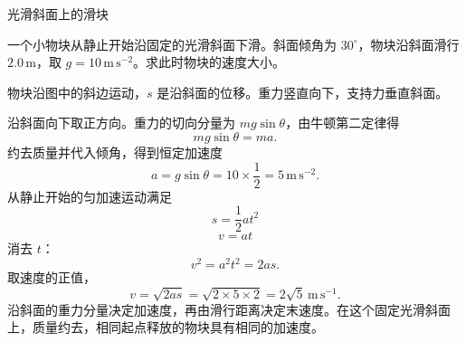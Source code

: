 \documentclass[11pt,a4paper]{article}
\begin{document}
\begin{center}\Large 光滑斜面上的滑块\end{center}
一个小物块从静止开始沿固定的光滑斜面下滑。斜面倾角为 $30^\circ$，物块沿斜面滑行 $2.0\,\mathrm m$，取 $g=10\,\mathrm{m\,s^{-2}}$。求此时物块的速度大小。
\begin{center}\end{center}
物块沿图中的斜边运动，$s$ 是沿斜面的位移。重力竖直向下，支持力垂直斜面。
\begin{center}\end{center}
沿斜面向下取正方向。重力的切向分量为 $mg\sin\theta$，由牛顿第二定律得
\begin{equation}mg\sin\theta=ma.\label{eq:newton}\end{equation}
约去质量并代入倾角，得到恒定加速度
\begin{equation}a=g\sin\theta=10\times\frac12=5\,\mathrm{m\,s^{-2}}.\label{eq:a}\end{equation}
从静止开始的匀加速运动满足
\begin{equation}s=\frac12at^2\label{eq:s}\end{equation}
\begin{equation}v=at\label{eq:vt}\end{equation}
消去 $t$：
\begin{equation}v^2=a^2t^2=2as.\label{eq:kinematics}\end{equation}
取速度的正值，
\begin{equation}v=\sqrt{2as}=\sqrt{2\times5\times2}=2\sqrt5\,\mathrm{m\,s^{-1}}.\label{eq:v}\end{equation}
沿斜面的重力分量决定加速度，再由滑行距离决定末速度。在这个固定光滑斜面上，质量约去，相同起点释放的物块具有相同的加速度。
\end{document}
